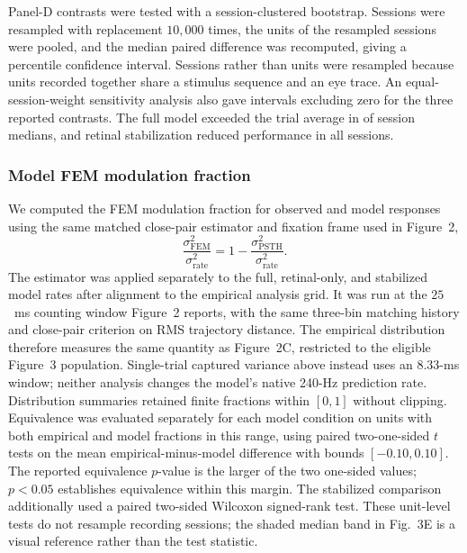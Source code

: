 \documentclass{lite}
\begin{document}
Panel-D contrasts were tested with a session-clustered bootstrap. Sessions were resampled with replacement $10{,}000$ times, the units of the resampled sessions were pooled, and the median paired difference was recomputed, giving a percentile confidence interval. Sessions rather than units were resampled because units recorded together share a stimulus sequence and an eye trace. An equal-session-weight sensitivity analysis also gave intervals excluding zero for the three reported contrasts. The full model exceeded the trial average in \FigThreeDFullPositiveSessions{} of \FigThreeSessions{} session medians, and retinal stabilization reduced performance in all \FigThreeSessions{} sessions.

\subsubsection{Model FEM modulation fraction}
We computed the FEM modulation fraction for observed and model responses using the same matched close-pair estimator and fixation frame used in Figure~2,
\begin{equation}
\frac{\sigma^2_{\mathrm{FEM}}}{\sigma^2_{\mathrm{rate}}}
=
1-\frac{\sigma^2_{\mathrm{PSTH}}}{\sigma^2_{\mathrm{rate}}}.
\end{equation}
The estimator was applied separately to the full, retinal-only, and stabilized model rates after alignment to the empirical analysis grid. It was run at the $25$~ms counting window Figure~2 reports, with the same three-bin matching history and close-pair criterion on RMS trajectory distance. The empirical distribution therefore measures the same quantity as Figure~2C, restricted to the eligible Figure~3 population. Single-trial captured variance above instead uses an $8.33$-ms window; neither analysis changes the model's native 240-Hz prediction rate. Distribution summaries retained finite fractions within $[0,1]$ without clipping. Equivalence was evaluated separately for each model condition on units with both empirical and model fractions in this range, using paired two-one-sided $t$ tests on the mean empirical-minus-model difference with bounds $[-0.10,0.10]$. The reported equivalence $p$-value is the larger of the two one-sided values; $p<0.05$ establishes equivalence within this margin. The stabilized comparison additionally used a paired two-sided Wilcoxon signed-rank test. These unit-level tests do not resample recording sessions; the shaded median band in Fig.~3E is a visual reference rather than the test statistic.
\end{document}
